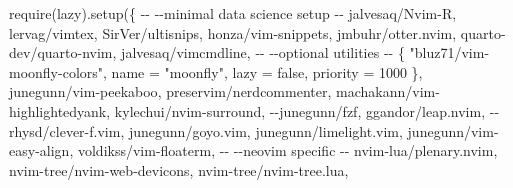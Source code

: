 \documentclass[
  letterpaper,
  DIV=11,
  numbers=noendperiod,
  oneside]{scrartcl}
\newenvironment{Shaded}{\begin{snugshade}}{\end{snugshade}}
\newcommand{\ErrorTok}[1]{\textcolor[rgb]{0.68,0.00,0.00}{#1}}
\newcommand{\ExtensionTok}[1]{\textcolor[rgb]{0.00,0.23,0.31}{#1}}
\newcommand{\KeywordTok}[1]{\textcolor[rgb]{0.00,0.23,0.31}{#1}}
\newcommand{\NormalTok}[1]{\textcolor[rgb]{0.00,0.23,0.31}{#1}}
\newcommand{\StringTok}[1]{\textcolor[rgb]{0.13,0.47,0.30}{#1}}
\begin{document}
\begin{Shaded}
\begin{Highlighting}[]

\ExtensionTok{require}\ErrorTok{(}\StringTok{\textquotesingle{}lazy\textquotesingle{}}\KeywordTok{)}\ExtensionTok{.setup}\ErrorTok{(}\KeywordTok{\{}
\ExtensionTok{{-}{-}}
\ExtensionTok{{-}{-}minimal}\NormalTok{ data science setup}
\ExtensionTok{{-}{-}}
\StringTok{\textquotesingle{}jalvesaq/Nvim{-}R\textquotesingle{}}\ExtensionTok{,}
\StringTok{\textquotesingle{}lervag/vimtex\textquotesingle{}}\ExtensionTok{,}
\StringTok{\textquotesingle{}SirVer/ultisnips\textquotesingle{}}\ExtensionTok{,}
\StringTok{\textquotesingle{}honza/vim{-}snippets\textquotesingle{}}\ExtensionTok{,}
\StringTok{\textquotesingle{}jmbuhr/otter.nvim\textquotesingle{}}\ExtensionTok{,}
\StringTok{\textquotesingle{}quarto{-}dev/quarto{-}nvim\textquotesingle{}}\ExtensionTok{,}
\StringTok{\textquotesingle{}jalvesaq/vimcmdline\textquotesingle{}}\ExtensionTok{,}
\ExtensionTok{{-}{-}}
\ExtensionTok{{-}{-}optional}\NormalTok{ utilities}
\ExtensionTok{{-}{-}}
\KeywordTok{\{} \StringTok{"bluz71/vim{-}moonfly{-}colors"}\ExtensionTok{,}\NormalTok{ name = }\StringTok{"moonfly"}\NormalTok{, lazy = false, priority = 1000 \},}
\StringTok{\textquotesingle{}junegunn/vim{-}peekaboo\textquotesingle{}}\ExtensionTok{,}
\StringTok{\textquotesingle{}preservim/nerdcommenter\textquotesingle{}}\ExtensionTok{,}
\StringTok{\textquotesingle{}machakann/vim{-}highlightedyank\textquotesingle{}}\ExtensionTok{,}
\StringTok{\textquotesingle{}kylechui/nvim{-}surround\textquotesingle{}}\ExtensionTok{,}
\ExtensionTok{{-}{-}}\StringTok{\textquotesingle{}junegunn/fzf\textquotesingle{}}\ExtensionTok{,}
\StringTok{\textquotesingle{}ggandor/leap.nvim\textquotesingle{}}\ExtensionTok{,}
\ExtensionTok{{-}{-}}\StringTok{\textquotesingle{}rhysd/clever{-}f.vim\textquotesingle{}}\ExtensionTok{,}
\StringTok{\textquotesingle{}junegunn/goyo.vim\textquotesingle{}}\ExtensionTok{,}
\StringTok{\textquotesingle{}junegunn/limelight.vim\textquotesingle{}}\ExtensionTok{,}
\StringTok{\textquotesingle{}junegunn/vim{-}easy{-}align\textquotesingle{}}\ExtensionTok{,}
\StringTok{\textquotesingle{}voldikss/vim{-}floaterm\textquotesingle{}}\ExtensionTok{,}
\ExtensionTok{{-}{-}}
\ExtensionTok{{-}{-}neovim}\NormalTok{ specific}
\ExtensionTok{{-}{-}}
\StringTok{\textquotesingle{}nvim{-}lua/plenary.nvim\textquotesingle{}}\ExtensionTok{,}
\StringTok{\textquotesingle{}nvim{-}tree/nvim{-}web{-}devicons\textquotesingle{}}\ExtensionTok{,}
\StringTok{\textquotesingle{}nvim{-}tree/nvim{-}tree.lua\textquotesingle{}}\ExtensionTok{,}

\end{Highlighting}
\end{Shaded}
\end{document}
